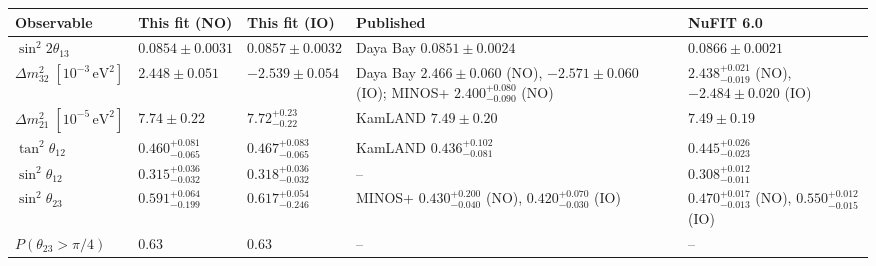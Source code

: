 \begin{tabular}{@{}lllll@{}}
  \toprule
  Observable & This fit (NO) & This fit (IO) & Published & NuFIT 6.0 \\
  \midrule
  \(\sin^2 2\theta_{13}\) & \(0.0854 \pm 0.0031\) & \(0.0857 \pm 0.0032\) & Daya Bay \(0.0851 \pm 0.0024\) & \(0.0866 \pm 0.0021\) \\
  \(\Delta m^2_{32}\;[10^{-3}\,\mathrm{eV}^2]\) & \(2.448 \pm 0.051\) & \(-2.539 \pm 0.054\) & Daya Bay \(2.466 \pm 0.060\) (NO), \(-2.571 \pm 0.060\) (IO); MINOS+ \(2.400^{+0.080}_{-0.090}\) (NO) & \(2.438^{+0.021}_{-0.019}\) (NO), \(-2.484 \pm 0.020\) (IO) \\
  \(\Delta m^2_{21}\;[10^{-5}\,\mathrm{eV}^2]\) & \(7.74 \pm 0.22\) & \(7.72^{+0.23}_{-0.22}\) & KamLAND \(7.49 \pm 0.20\) & \(7.49 \pm 0.19\) \\
  \(\tan^2\theta_{12}\) & \(0.460^{+0.081}_{-0.065}\) & \(0.467^{+0.083}_{-0.065}\) & KamLAND \(0.436^{+0.102}_{-0.081}\) & \(0.445^{+0.026}_{-0.023}\) \\
  \(\sin^2\theta_{12}\) & \(0.315^{+0.036}_{-0.032}\) & \(0.318^{+0.036}_{-0.032}\) & -- & \(0.308^{+0.012}_{-0.011}\) \\
  \(\sin^2\theta_{23}\) & \(0.591^{+0.064}_{-0.199}\) & \(0.617^{+0.054}_{-0.246}\) & MINOS+ \(0.430^{+0.200}_{-0.040}\) (NO), \(0.420^{+0.070}_{-0.030}\) (IO) & \(0.470^{+0.017}_{-0.013}\) (NO), \(0.550^{+0.012}_{-0.015}\) (IO) \\
  \(P(\theta_{23} > \pi/4)\) & 0.63 & 0.63 & -- & -- \\
  \bottomrule
\end{tabular}
